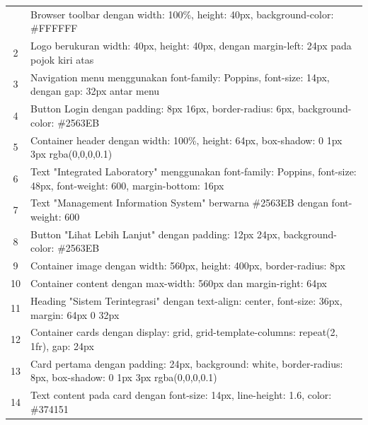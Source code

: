 \begin{enumerate}
\begin{longtable}{c p{}}
		      \selectfont
		      1                       & Browser toolbar dengan width: 100\%, height: 40px, background-color: \#FFFFFF                                         \\
		      2                       & Logo berukuran width: 40px, height: 40px, dengan margin-left: 24px pada pojok kiri atas                               \\
		      3                       & Navigation menu menggunakan font-family: Poppins, font-size: 14px, dengan gap: 32px antar menu                        \\
		      4                       & Button Login dengan padding: 8px 16px, border-radius: 6px, background-color: \#2563EB                                 \\
		      5                       & Container header dengan width: 100\%, height: 64px, box-shadow: 0 1px 3px rgba(0,0,0,0.1)                             \\
		      6                       & Text "Integrated Laboratory" menggunakan font-family: Poppins, font-size: 48px, font-weight: 600, margin-bottom: 16px \\
		      7                       & Text "Management Information System" berwarna \#2563EB dengan font-weight: 600                                        \\
		      8                       & Button "Lihat Lebih Lanjut" dengan padding: 12px 24px, background-color: \#2563EB                                     \\
		      9                       & Container image dengan width: 560px, height: 400px, border-radius: 8px                                                \\
		      10                      & Container content dengan max-width: 560px dan margin-right: 64px                                                      \\
		      11                      & Heading "Sistem Terintegrasi" dengan text-align: center, font-size: 36px, margin: 64px 0 32px                         \\
		      12                      & Container cards dengan display: grid, grid-template-columns: repeat(2, 1fr), gap: 24px                                \\
		      13                      & Card pertama dengan padding: 24px, background: white, border-radius: 8px, box-shadow: 0 1px 3px rgba(0,0,0,0.1)       \\
		      14                      & Text content pada card dengan font-size: 14px, line-height: 1.6, color: \#374151                                      \\

\end{longtable}
\end{enumerate}
